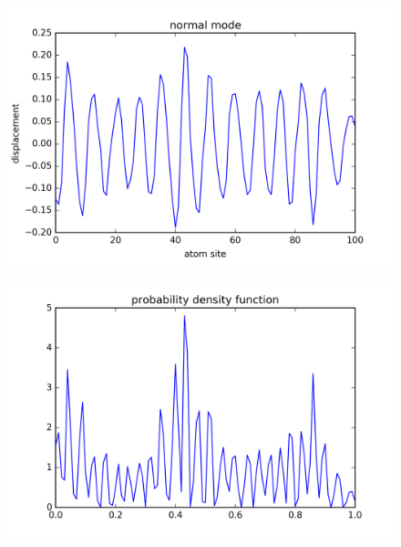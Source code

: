 \begin{figure}[!htbh]
\centering
\begin{minipage}{.45\textwidth}
  \centering
  \includegraphics[width=1.1\linewidth]{Harmonic_spring_ratio/spr_N_103sp_2p_0_526th.png}
  \label{fig:spring normal mode low frequency}
\end{minipage}\qquad
\begin{minipage}{.45\textwidth}
  \centering
  \includegraphics[width=1.1\linewidth]{Harmonic_spring_ratio/densProb_0_5N_103m_2p_26th.png}
  \label{fig:spring prob density low frequency}
\end{minipage}
\end{figure}

